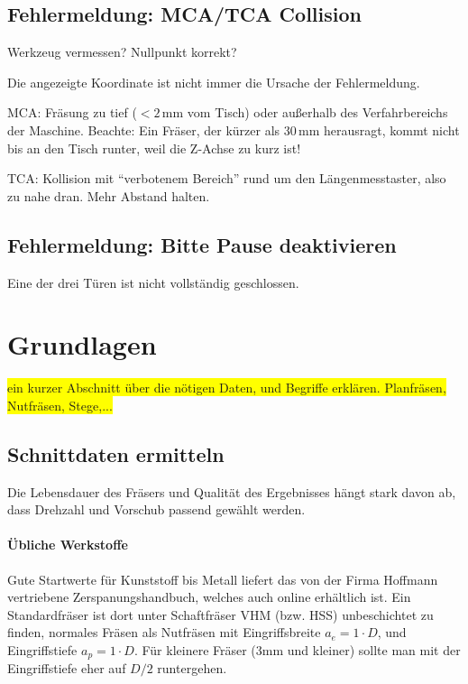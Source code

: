 \documentclass{\basedir/fablab-document}
\renewcommand{\todo}[1]{\colorbox{yellow}{{#1}}}
\begin{document}
\subsection{Fehlermeldung: MCA/TCA Collision}
Werkzeug vermessen? Nullpunkt korrekt?

Die angezeigte Koordinate ist nicht immer die Ursache der Fehlermeldung.

MCA: Fräsung zu tief ($<2$\,mm vom Tisch) oder außerhalb des Verfahrbereichs der Maschine. Beachte: Ein Fräser, der kürzer als 30\,mm herausragt, kommt nicht bis an den Tisch runter, weil die Z-Achse zu kurz ist!

TCA: Kollision mit \enquote{verbotenem Bereich} rund um den Längenmesstaster, also zu nahe dran. Mehr Abstand halten.

\subsection{Fehlermeldung: Bitte Pause deaktivieren}
Eine der drei Türen ist nicht vollständig geschlossen.

\section{Grundlagen}
\todo{ein kurzer Abschnitt über die nötigen Daten, und Begriffe erklären. Planfräsen, Nutfräsen, Stege,...}

\subsection{Schnittdaten ermitteln}

Die Lebensdauer des Fräsers und Qualität des Ergebnisses hängt stark davon ab, dass Drehzahl und Vorschub passend gewählt werden.

\paragraph{Übliche Werkstoffe} Gute Startwerte für Kunststoff bis Metall liefert das von der Firma Hoffmann vertriebene Zerspanungshandbuch, welches auch online erhältlich ist. Ein Standardfräser ist dort unter Schaftfräser VHM (bzw. HSS) unbeschichtet zu finden, normales Fräsen als Nutfräsen mit Eingriffsbreite $a_e=1\cdot D$, und Eingriffstiefe $a_p=1 \cdot D$. Für kleinere Fräser (3mm und kleiner) sollte man mit der Eingriffstiefe eher auf $D/2$ runtergehen.
\end{document}
